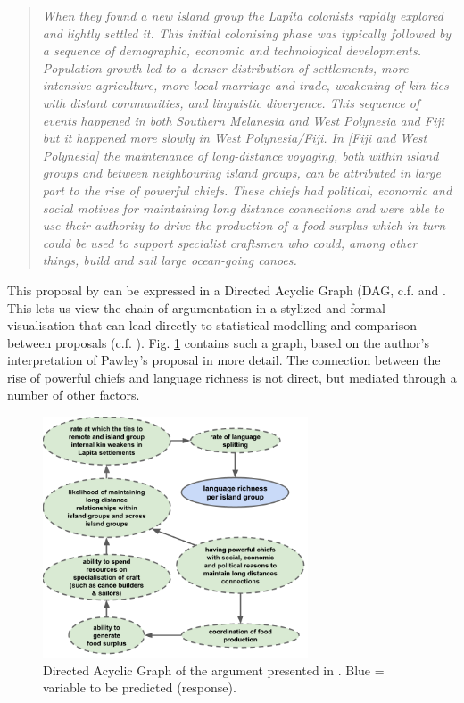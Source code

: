 \documentclass[unnumsec,webpdf,modern,medium]{oup-authoring-template}
\begin{document}
\begin{quotation}
\noindent \emph{When they found a new island group the Lapita colonists rapidly explored and lightly settled it. This initial colonising phase was typically followed by a sequence of demographic, economic and technological developments. Population growth led to a denser distribution of settlements, more intensive agriculture, more local marriage and trade, weakening of kin ties with distant communities, and linguistic divergence. This sequence of events happened in both Southern Melanesia and West Polynesia and Fiji but it happened more slowly in West Polynesia/Fiji. In [Fiji and West Polynesia] the maintenance of long-distance voyaging, both within island groups and between neighbouring island groups, can be attributed in large part to the rise of powerful chiefs. These chiefs had political, economic and social motives for maintaining long distance connections and were able to use their authority to drive the production of a food surplus which in turn could be used to support specialist craftsmen who could, among other things, build and sail large ocean-going canoes.} \citep[28]{pawley2007} \end{quotation}

This proposal by \citet{pawley81, pawley2007} can be expressed in a Directed Acyclic Graph (DAG, c.f. \citet{pearl1995causal} and \citet{mcelreath2020statistical}. This lets us view the chain of argumentation in a stylized and formal visualisation that can lead directly to statistical modelling and comparison between proposals (c.f. \citet{roberts2020chield}). Fig. \ref{Predicting_lgs_DAG_andy} contains such a graph, based on the author's interpretation of Pawley's proposal in more detail. The connection between the rise of powerful chiefs and language richness is not direct, but mediated through a number of other factors. 



\begin{figure}[ht]
\centering
\includegraphics[width=0.7\textwidth]{Predicting_lgs_DAG_andy}
\caption{Directed Acyclic Graph of the argument presented in \cite{pawley2007}. Blue = variable to be predicted (response).}
\label{Predicting_lgs_DAG_andy}
\end{figure}
\end{document}
